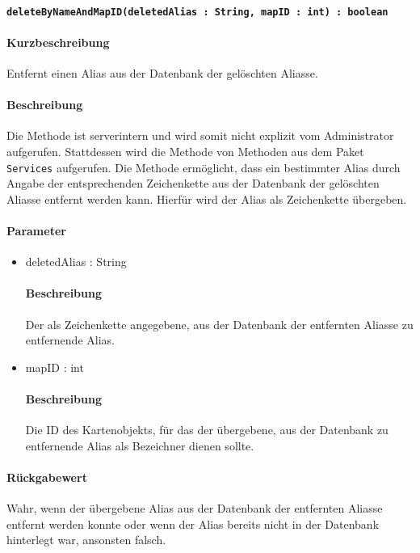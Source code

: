 \paragraph{\texttt{deleteByNameAndMapID(deletedAlias : String, mapID : int) : boolean}}%
\paragraph*{Kurzbeschreibung}
Entfernt einen Alias aus der Datenbank der gelöschten Aliasse.
\paragraph*{Beschreibung}
Die Methode ist serverintern und wird somit nicht explizit vom Administrator aufgerufen.
Stattdessen wird die Methode von Methoden aus dem Paket \texttt{Services} aufgerufen.
Die Methode ermöglicht, dass ein bestimmter Alias durch Angabe der entsprechenden Zeichenkette aus der Datenbank der gelöschten Aliasse entfernt werden kann.
Hierfür wird der Alias als Zeichenkette übergeben.
\paragraph*{Parameter}
\begin{itemize}
    \item deletedAlias : String
    		\paragraph*{Beschreibung}
    		Der als Zeichenkette angegebene, aus der Datenbank der entfernten Aliasse zu entfernende Alias.
    	\item mapID : int
    		\paragraph*{Beschreibung}
    		Die ID des Kartenobjekts, für das der übergebene, aus der Datenbank zu entfernende Alias als Bezeichner dienen sollte.
\end{itemize}
\paragraph*{Rückgabewert}
Wahr, wenn der übergebene Alias aus der Datenbank der entfernten Aliasse entfernt werden konnte oder wenn der Alias bereits nicht in der Datenbank hinterlegt war, ansonsten falsch.
